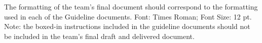\begin{center}
    The formatting of the team's final document should correspond to the
    formatting used in each of the Guideline documents.
    Font: Times Roman; Font Size: 12 pt.
    Note: the boxed-in instructions included in the guideline documents should
    not be included in the team's final draft and delivered document.
\end{center}